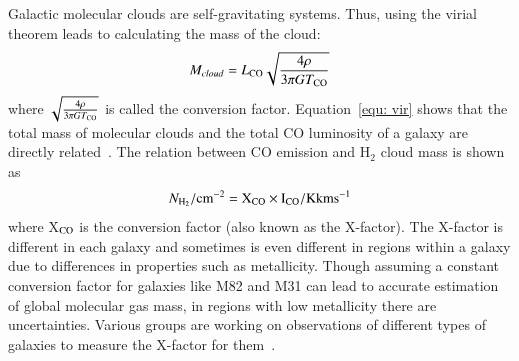 Galactic molecular clouds are self-gravitating systems. %
Thus, using the virial theorem leads to calculating the mass of the cloud: %
 \begin{equation}
 \label{equ: vir}
 M_{cloud} = L_{\rm CO} \sqrt{\frac{4\rho}{3\pi G T_{\rm CO}}}
 \end{equation}
 where $\sqrt{\frac{4\rho}{3\pi G T_{\rm CO}}}$ is called the conversion factor. %
 Equation~\ref{equ: vir} shows that the total mass of molecular clouds and the total CO luminosity of a galaxy are directly related~\citep{Young91}. %
 The relation between CO emission and H$_2$ cloud mass is shown as
\begin{equation}
N_{\rm H_2}/\rm cm^{-2} = X_{\rm CO} \times I_{\rm CO}/{\rm K km s}^{-1}
\end{equation}
where X$_{\rm CO}$ is the conversion factor (also known as the X-factor).
The X-factor is different in each galaxy and sometimes is even different in regions within a galaxy due to differences in properties such as metallicity. 
Though assuming a constant conversion factor for galaxies like M82 and M31 can lead to accurate estimation of global molecular gas mass, in regions with low metallicity there are uncertainties. %
Various groups are working on observations of different types of galaxies to measure the X-factor for them~\citep{Wilson95, Bosselli02, Bolato13}.


